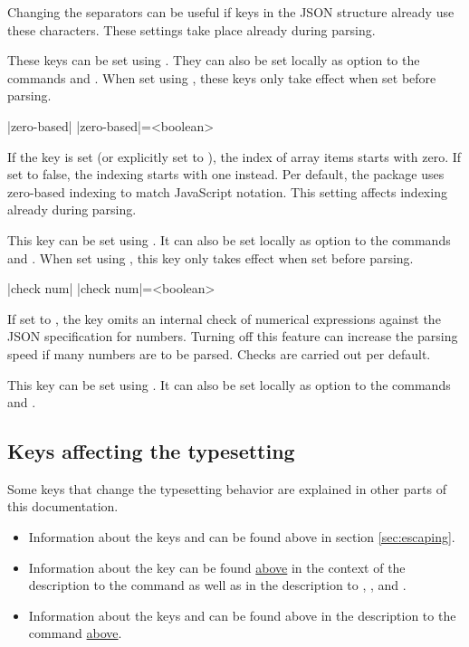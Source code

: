 \documentclass[a4paper]{article}
\begin{document}
{{Changing the separators can be useful if keys in the JSON structure already use these characters. These settings take place already during parsing.

These keys can be set using \macro{\JSONParseSet}. They can also be set locally as option to the commands \macro{\JSONParse} and \macro{\JSONParseFromFile}. When set using \macro{\JSONParseSet}, these keys only take effect when set before parsing.

\begin{macrodef}
|zero-based|
|zero-based|={<boolean>}
\end{macrodef}
If the key  is set (or explicitly set to ), the index of array items starts with zero. If set to false, the indexing starts with one instead. Per default, the package uses zero-based indexing to match JavaScript notation. This setting affects indexing already during parsing.

This key can be set using \macro{\JSONParseSet}. It can also be set locally as option to the commands \macro{\JSONParse} and \macro{\JSONParseFromFile}. When set using \macro{\JSONParseSet}, this key only takes effect when set before parsing.

\begin{macrodef}
|check num|
|check num|={<boolean>}
\end{macrodef}
If set to , the key  omits an internal check of numerical expressions against the JSON specification for numbers. Turning off this feature can increase the parsing speed if many numbers are to be parsed. Checks are carried out per default.

This key can be set using \macro{\JSONParseSet}. It can also be set locally as option to the commands \macro{\JSONParse} and \macro{\JSONParseFromFile}.

\subsection{Keys affecting the typesetting}

Some keys that change the typesetting behavior are explained in other parts of this documentation.

\begin{itemize}
\item Information about the keys  and  can be found above in section \ref{sec:escaping}.
\item Information about the key  can be found \hyperlink{key:storein}{above} in the context of the description to the command \macro{\JSONParseValue} as well as in the description to \macro{\JSONParseKeys}, \macro{\JSONParseArrayCount}, \macro{\JSONParseArrayUse} and \macro{\JSONParseArrayMapInline}.
\item Information about the keys  and  can be found above in the description to the command \macro{\JSONParseArrayMapFunction} \hyperlink{macro:arraymapfunction}{above}.
\end{itemize}

}}
\end{document}
